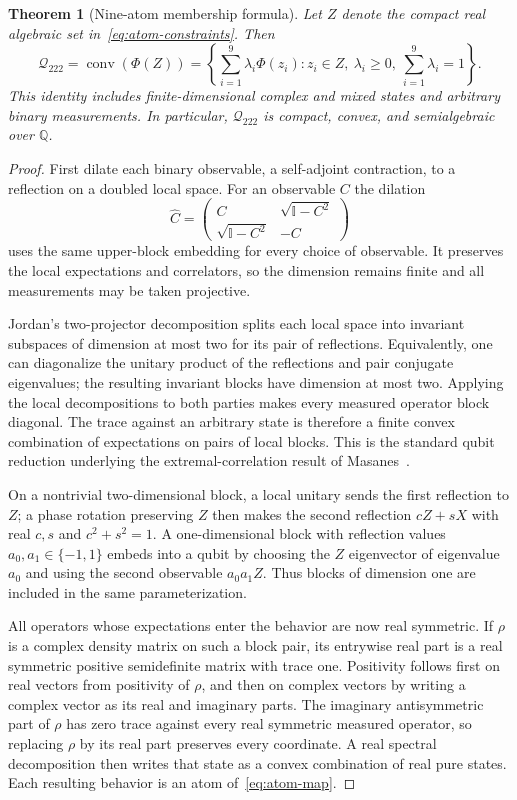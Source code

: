 \documentclass[11pt]{article}
\newcommand{\Q}{{\mathcal Q_{222}}}
\newcommand{\Id}{\mathbb I}
\newtheorem{theorem}{Theorem}
\begin{document}
\begin{theorem}[Nine-atom membership formula]\label{thm:physical}
Let $Z$ denote the compact real algebraic set in~\eqref{eq:atom-constraints}. Then
\[
 \Q=\operatorname{conv}(\Phi(Z))
 =\left\{\sum_{i=1}^{9}\lambda_i\Phi(z_i):
       z_i\in Z,\ \lambda_i\ge0,\ \sum_{i=1}^{9}\lambda_i=1\right\}.
\]
This identity includes finite-dimensional complex and mixed states and arbitrary binary measurements. In particular, $\Q$ is compact, convex, and semialgebraic over $\mathbb Q$.
\end{theorem}
\begin{proof}
First dilate each binary observable, a self-adjoint contraction, to a reflection on a doubled local space. For an observable $C$ the dilation
\[
 \widehat C=\begin{pmatrix}C&\sqrt{\Id-C^2}\\
             \sqrt{\Id-C^2}&-C\end{pmatrix}
\]
uses the same upper-block embedding for every choice of observable. It preserves the local expectations and correlators, so the dimension remains finite and all measurements may be taken projective.

Jordan's two-projector decomposition splits each local space into invariant subspaces of dimension at most two for its pair of reflections. Equivalently, one can diagonalize the unitary product of the reflections and pair conjugate eigenvalues; the resulting invariant blocks have dimension at most two. Applying the local decompositions to both parties makes every measured operator block diagonal. The trace against an arbitrary state is therefore a finite convex combination of expectations on pairs of local blocks. This is the standard qubit reduction underlying the extremal-correlation result of Masanes~\cite{Masanes}.

On a nontrivial two-dimensional block, a local unitary sends the first reflection to $Z$; a phase rotation preserving $Z$ then makes the second reflection $cZ+sX$ with real $c,s$ and $c^2+s^2=1$. A one-dimensional block with reflection values $a_0,a_1\in\{-1,1\}$ embeds into a qubit by choosing the $Z$ eigenvector of eigenvalue $a_0$ and using the second observable $a_0a_1Z$. Thus blocks of dimension one are included in the same parameterization.

All operators whose expectations enter the behavior are now real symmetric. If $\rho$ is a complex density matrix on such a block pair, its entrywise real part is a real symmetric positive semidefinite matrix with trace one. Positivity follows first on real vectors from positivity of $\rho$, and then on complex vectors by writing a complex vector as its real and imaginary parts. The imaginary antisymmetric part of $\rho$ has zero trace against every real symmetric measured operator, so replacing $\rho$ by its real part preserves every coordinate. A real spectral decomposition then writes that state as a convex combination of real pure states. Each resulting behavior is an atom of~\eqref{eq:atom-map}.


\end{proof}
\end{document}
